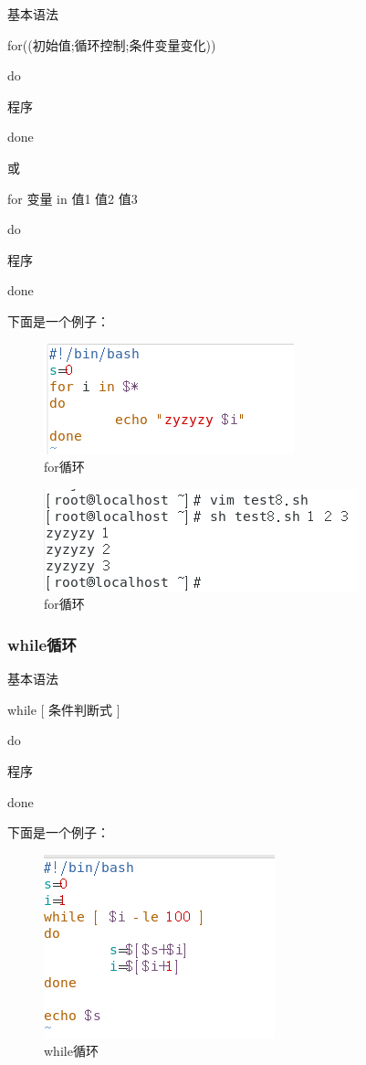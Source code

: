 \documentclass{ctexart}
\begin{document}
	基本语法
	
	for((初始值;循环控制;条件变量变化))
	
	do
	
	\quad \quad 程序
	
	done
	
	或
	
	for 变量 in 值1 值2 值3
	
	do
	
	\quad \quad 程序
	
	done 
	
	下面是一个例子：
	
	\begin{figure}[H]
		\centering
		\includegraphics{2.23}
		\caption{for循环}
	\end{figure}
	
	\begin{figure}[H]
		\centering
		\includegraphics{2.24}
		\caption{for循环}
	\end{figure}
	
	\subsubsection{while循环}
	
	基本语法
	
	while [ 条件判断式 ]
	
	do
	
	\quad \quad 程序
	
	done 
	
	下面是一个例子：
	
	\begin{figure}[H]
		\centering
		\includegraphics{2.25}
		\caption{while循环}
	\end{figure}
	
\end{document}
